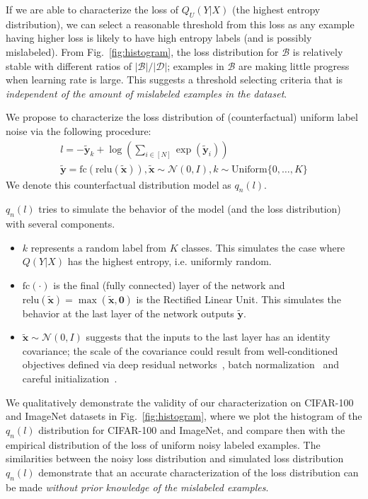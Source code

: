 \documentclass[a4paper,11pt]{article}
\newcommand{\mc}[1]{\mathcal{#1}}
\def\rvx{{\mathbf{x}}}
\def\rvy{{\mathbf{y}}}
\def\vzero{{\bm{0}}}
\def\vy{{\bm{y}}}
\begin{document}
If we are able to characterize the loss of $Q_U(Y|X)$ (the highest entropy distribution), we can select a reasonable threshold from this loss as any example having higher loss is likely to have high entropy labels (and is possibly mislabeled).
From Fig.~\ref{fig:histogram}, the loss distribution for $\mc{B}$ is relatively stable with different ratios of $|\mc{B}|/|\mc{D}|$; examples in $\mc{B}$ are making little progress when learning rate is large. This suggests a threshold selecting criteria that is \textit{independent of the amount of mislabeled examples in the dataset}.

We propose to characterize the loss distribution of (counterfactual) uniform label noise via the following procedure:
\begin{gather}
l =  -\tilde{\rvy}_k + \log \left(\sum_{i \in [N]} \exp(\tilde{\rvy}_i)\right) \label{eq:loss-dist} \\
\tilde{\rvy} = \mathrm{fc}(\mathrm{relu}(\tilde{\rvx})), \tilde{\rvx} \sim \mathcal{N}(0, I), k \sim \mathrm{Uniform}\{0, \ldots, K\} \nonumber
\end{gather}
We denote this counterfactual distribution model as $q_n(l)$.

$q_n(l)$ tries to simulate the behavior of the model (and the loss distribution) with several components.
\begin{itemize}
    \item $k$ represents a random label from $K$ classes. This simulates the case where $Q(Y|X)$ has the highest entropy, i.e. uniformly random.
    \item $\mathrm{fc}(\cdot)$ is the final (fully connected) layer of the network and $\mathrm{relu}(\tilde{\rvx}) = \max(\tilde{\rvx}, \vzero)$ is the Rectified Linear Unit. This simulates the behavior at the last layer of the network outputs $\tilde{\vy}$.
    \item $\tilde{\rvx} \sim \mathcal{N}(0, I)$ suggests that the inputs to the last layer has an identity covariance; the scale of the covariance could result from well-conditioned objectives defined via deep residual networks~\cite{he2015deep}, batch normalization~\cite{ioffe2015batch} and careful initialization~\cite{he2015delving}.
\end{itemize}
We qualitatively demonstrate the validity of our characterization on CIFAR-100 and ImageNet datasets in Fig.~\ref{fig:histogram}, where we plot the histogram of the $q_n(l)$ distribution for CIFAR-100 and ImageNet, and compare then with the empirical distribution of the loss of uniform noisy labeled examples.
The similarities between the noisy loss distribution and simulated loss distribution $q_n(l)$ demonstrate that an accurate characterization of the loss distribution can be made \textit{without prior knowledge of the mislabeled examples}. 
\end{document}
